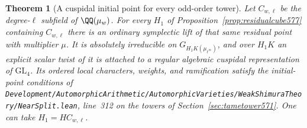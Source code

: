 \documentclass[a4paper,11pt]{article}
\newtheorem{theorem}[proposition]{Theorem}
\theoremstyle{definition}
\theoremstyle{remark}
\newcommand{\srcloc}[2]{{\small\nolinkurl{#1.lean}}, line~#2}
\numberwithin{equation}{section}
\begin{document}
\begin{theorem}[A cuspidal initial point for every odd-order tower]
\leavevmode\label{thm:cuspidalinitial577}
Let \(C_{w,\ell}\) be the degree-\(\ell\) subfield of
\(\QQ(\mu_w)\). For every \(H_1\) of
Proposition~\ref{prop:residualcube577} containing \(C_{w,\ell}\)
there is an ordinary symplectic lift of that same residual
point with multiplier \(\mu\). It is absolutely irreducible on
\(G_{H_1K(\mu_{\ell^\infty})}\), and over \(H_1K\) an explicit
scalar twist of it is attached to a regular algebraic cuspidal
representation of \(\mathrm{GL}_4\). Its ordered local characters,
weights, and ramification satisfy the initial-point conditions
of \srcloc{Development/AutomorphicArithmetic/AutomorphicVarieties/WeakShimuraTheory/NearSplit}{312}
on the towers of Section~\ref{sec:tametower571}. One can take
\(H_1=HC_{w,\ell}\).
\end{theorem}
\end{document}
